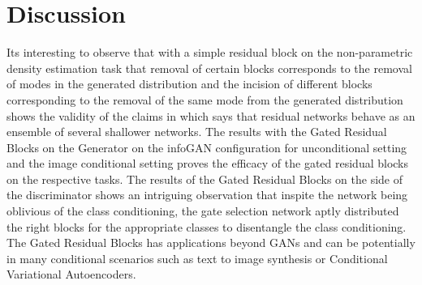 \documentclass[10pt,twocolumn,letterpaper]{article}
\begin{document}



\section{Discussion}
Its interesting to observe that with a simple residual block on the non-parametric density estimation task that removal of certain blocks corresponds to the removal of modes in the generated distribution and the incision of different blocks corresponding to the removal of the same mode from the generated distribution shows the validity of the claims in \cite{veit2016residual} which says that residual networks behave as an ensemble of several shallower networks. The results with the Gated Residual Blocks on the Generator on the infoGAN configuration for unconditional setting and the image conditional setting proves the efficacy of the gated residual blocks on the respective tasks. The results of the Gated Residual Blocks on the side of the discriminator shows an intriguing observation that inspite the network being oblivious of the class conditioning, the gate selection network aptly distributed the right blocks for the appropriate classes to disentangle the class conditioning. The Gated Residual Blocks has applications beyond GANs and can be potentially in many conditional scenarios such as text to image synthesis or Conditional Variational Autoencoders. 
\end{document}
